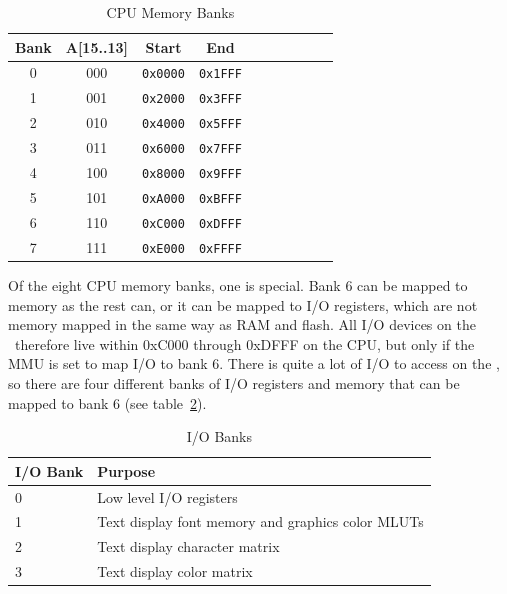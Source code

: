 \begin{table}[ht]
	\begin{center}
		\begin{tabular}{| c | c || c | c | c | c | c | c | c | c |} \hline
			Bank & A[15..13] & Start & End \\ \hline\hline
			0 & 000 & \verb+0x0000+ & \verb+0x1FFF+ \\ \hline
			1 & 001 & \verb+0x2000+ & \verb+0x3FFF+ \\ \hline
			2 & 010 & \verb+0x4000+ & \verb+0x5FFF+ \\ \hline
			3 & 011 & \verb+0x6000+ & \verb+0x7FFF+ \\ \hline
			4 & 100 & \verb+0x8000+ & \verb+0x9FFF+ \\ \hline
			5 & 101 & \verb+0xA000+ & \verb+0xBFFF+ \\ \hline
			6 & 110 & \verb+0xC000+ & \verb+0xDFFF+ \\ \hline
			7 & 111 & \verb+0xE000+ & \verb+0xFFFF+ \\ \hline
		\end{tabular}
	\end{center}
	\caption{CPU Memory Banks}
	\label{tab:mem_banks}
\end{table}

Of the eight CPU memory banks, one is special. Bank 6 can be mapped to memory as the rest can, or it can be mapped to I/O registers, which are not memory mapped in the same way as RAM and flash. All I/O devices on the \jr\ therefore live within 0xC000 through 0xDFFF on the CPU, but only if the MMU is set to map I/O to bank 6. There is quite a lot of I/O to access on the \jr, so there are four different banks of I/O registers and memory that can be mapped to bank 6 (see table~\ref{tab:io_banks}).

\begin{table}[ht]
	\begin{center}
		\begin{tabular}{| l | l |} \hline
			I/O Bank & Purpose \\ \hline\hline
			0 & Low level I/O registers \\ \hline
			1 & Text display font memory and graphics color MLUTs \\ \hline
			2 & Text display character matrix \\ \hline
			3 & Text display color matrix \\ \hline
		\end{tabular}
	\end{center}
	\caption{I/O Banks}
	\label{tab:io_banks}
\end{table}

